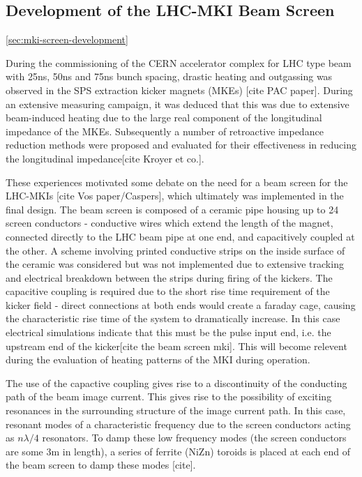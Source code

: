 \subsection{Development of the LHC-MKI Beam Screen}
\ref{sec:mki-screen-development}

During the commissioning of the CERN accelerator complex for LHC type beam with 25ns, 50ns and 75ns bunch spacing, drastic heating and outgassing was observed in the SPS extraction kicker magnets (MKEs) [cite PAC paper]. During an extensive measuring campaign, it was deduced that this was due to extensive beam-induced heating due to the large real component of the longitudinal impedance of the MKEs. Subsequently a number of retroactive impedance reduction methods were proposed and evaluated for their effectiveness in reducing the longitudinal impedance[cite Kroyer et co.].

These experiences motivated some debate on the need for a beam screen for the LHC-MKIs [cite Vos paper/Caspers], which ultimately was implemented in the final design. The beam screen is composed of a ceramic pipe housing up to 24 screen conductors - conductive wires which extend the length of the magnet, connected directly to the LHC beam pipe at one end, and capacitively coupled at the other. A scheme involving printed conductive strips on the inside surface of the ceramic was considered but was not implemented due to extensive tracking and electrical breakdown between the strips during firing of the kickers. The capacitive coupling is required due to the short rise time requirement of the kicker field - direct connections at both ends would create a faraday cage, causing the characteristic rise time of the system to dramatically increase. In this case electrical simulations indicate that this must be the pulse input end, i.e. the upstream end of the kicker[cite the beam screen mki]. This will become relevent during the evaluation of heating patterns of the MKI during operation.

The use of the capactive coupling gives rise to a discontinuity of the conducting path of the beam image current. This gives rise to the possibility of exciting resonances in the surrounding structure of the image current path. In this case, resonant modes of a characteristic frequency due to the screen conductors acting as $n \lambda /4$ resonators. To damp these low frequency modes (the screen conductors are some 3m in length), a series of ferrite (NiZn) toroids is placed at each end of the beam screen to damp these modes [cite]. 

